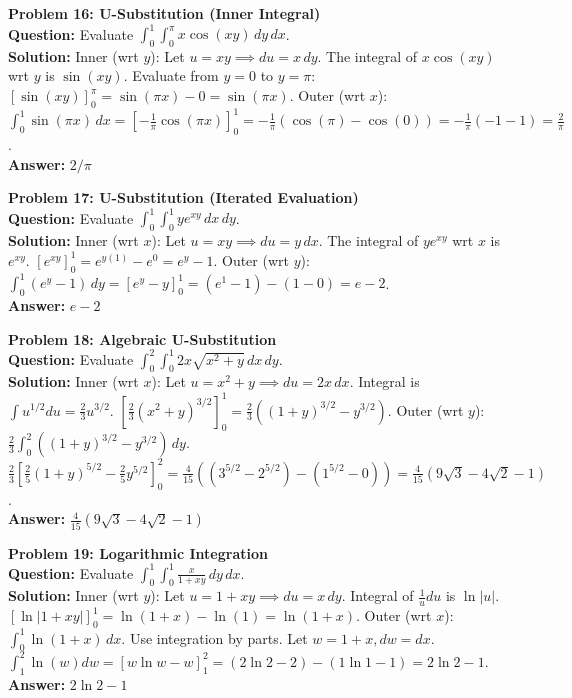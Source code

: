 \documentclass[11pt]{article}
\begin{document}
\vspace{0.5cm}
\noindent\textbf{Problem 16: U-Substitution (Inner Integral)} \\
\textbf{Question:} Evaluate $\int_0^1 \int_0^{\pi} x \cos(xy) \, dy \, dx$. \\
\textbf{Solution:} Inner (wrt $y$): Let $u = xy \implies du = x \, dy$. The integral of $x \cos(xy)$ wrt $y$ is $\sin(xy)$.
Evaluate from $y=0$ to $y=\pi$: $\left[ \sin(xy) \right]_0^\pi = \sin(\pi x) - 0 = \sin(\pi x)$.
Outer (wrt $x$): $\int_0^1 \sin(\pi x) \, dx = \left[ -\frac{1}{\pi} \cos(\pi x) \right]_0^1 = -\frac{1}{\pi}(\cos(\pi) - \cos(0)) = -\frac{1}{\pi}(-1 - 1) = \frac{2}{\pi}$. \\
\textbf{Answer:} $2/\pi$

\vspace{0.5cm}
\noindent\textbf{Problem 17: U-Substitution (Iterated Evaluation)} \\
\textbf{Question:} Evaluate $\int_0^1 \int_0^1 y e^{xy} \, dx \, dy$. \\
\textbf{Solution:} Inner (wrt $x$): Let $u = xy \implies du = y \, dx$. The integral of $y e^{xy}$ wrt $x$ is $e^{xy}$.
$\left[ e^{xy} \right]_0^1 = e^{y(1)} - e^0 = e^y - 1$.
Outer (wrt $y$): $\int_0^1 (e^y - 1) \, dy = \left[ e^y - y \right]_0^1 = (e^1 - 1) - (1 - 0) = e - 2$. \\
\textbf{Answer:} $e - 2$

\vspace{0.5cm}
\noindent\textbf{Problem 18: Algebraic U-Substitution} \\
\textbf{Question:} Evaluate $\int_0^2 \int_0^1 2x \sqrt{x^2+y} \, dx \, dy$. \\
\textbf{Solution:} Inner (wrt $x$): Let $u = x^2+y \implies du = 2x \, dx$. Integral is $\int u^{1/2} du = \frac{2}{3}u^{3/2}$.
$\left[ \frac{2}{3}(x^2+y)^{3/2} \right]_0^1 = \frac{2}{3}((1+y)^{3/2} - y^{3/2})$.
Outer (wrt $y$): $\frac{2}{3} \int_0^2 ((1+y)^{3/2} - y^{3/2}) \, dy$.
$\frac{2}{3} \left[ \frac{2}{5}(1+y)^{5/2} - \frac{2}{5}y^{5/2} \right]_0^2 = \frac{4}{15} \left( (3^{5/2} - 2^{5/2}) - (1^{5/2} - 0) \right) = \frac{4}{15}(9\sqrt{3} - 4\sqrt{2} - 1)$. \\
\textbf{Answer:} $\frac{4}{15}(9\sqrt{3} - 4\sqrt{2} - 1)$

\vspace{0.5cm}
\noindent\textbf{Problem 19: Logarithmic Integration} \\
\textbf{Question:} Evaluate $\int_0^1 \int_0^1 \frac{x}{1+xy} \, dy \, dx$. \\
\textbf{Solution:} Inner (wrt $y$): Let $u = 1+xy \implies du = x \, dy$. Integral of $\frac{1}{u} du$ is $\ln|u|$.
$\left[ \ln|1+xy| \right]_0^1 = \ln(1+x) - \ln(1) = \ln(1+x)$.
Outer (wrt $x$): $\int_0^1 \ln(1+x) \, dx$. Use integration by parts. Let $w = 1+x, dw = dx$.
$\int_1^2 \ln(w) dw = [w \ln w - w]_1^2 = (2 \ln 2 - 2) - (1 \ln 1 - 1) = 2 \ln 2 - 1$. \\
\textbf{Answer:} $2 \ln 2 - 1$
\end{document}

